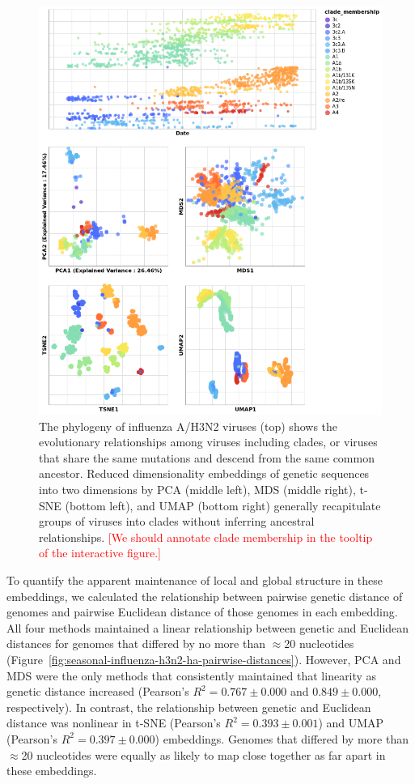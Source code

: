 \documentclass[9pt,lineno]{elife}
\def\jhc#1{\textcolor{red}{[#1]}}
\begin{document}
\begin{figure}[htb]
  \begin{center}
  \includegraphics[width=\columnwidth]{flu-embeddings}
  \caption{
    The phylogeny of influenza A/H3N2 viruses (top) shows the evolutionary relationships among viruses including clades, or viruses that share the same mutations and descend from the same common ancestor.
    Reduced dimensionality embeddings of genetic sequences into two dimensions by PCA (middle left), MDS (middle right), t-SNE (bottom left), and UMAP (bottom right) generally recapitulate groups of viruses into clades without inferring ancestral relationships.
    \jhc{We should annotate clade membership in the tooltip of the interactive figure.}
  }
  \label{fig:seasonal-influenza-h3n2-ha-embeddings}
  \end{center}
\end{figure}

To quantify the apparent maintenance of local and global structure in these embeddings, we calculated the relationship between pairwise genetic distance of genomes and pairwise Euclidean distance of those genomes in each embedding.
All four methods maintained a linear relationship between genetic and Euclidean distances for genomes that differed by no more than $\approx$20 nucleotides (Figure~\ref{fig:seasonal-influenza-h3n2-ha-pairwise-distances}).
However, PCA and MDS were the only methods that consistently maintained that linearity as genetic distance increased (Pearson's $R^{2} = 0.767 \pm 0.000$  and $0.849 \pm 0.000$, respectively).
In contrast, the relationship between genetic and Euclidean distance was nonlinear in t-SNE (Pearson's $R^{2} = 0.393 \pm 0.001$) and UMAP (Pearson's $R^{2} = 0.397 \pm 0.000$) embeddings.
Genomes that differed by more than $\approx$20 nucleotides were equally as likely to map close together as far apart in these embeddings.
\end{document}
